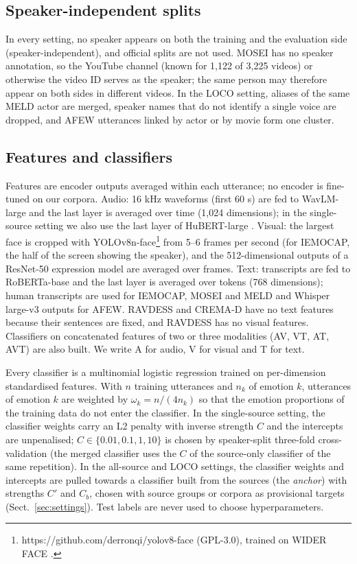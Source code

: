 \subsection{Speaker-independent splits}\label{sec:split}
In every setting, no speaker appears on both the training and the evaluation side (speaker-independent), and official splits are not used. MOSEI has no speaker annotation, so the YouTube channel (known for 1,122 of 3,225 videos) or otherwise the video ID serves as the speaker; the same person may therefore appear on both sides in different videos. In the LOCO setting, aliases of the same MELD actor are merged, speaker names that do not identify a single voice are dropped, and AFEW utterances linked by actor or by movie form one cluster.

\subsection{Features and classifiers}
Features are encoder outputs averaged within each utterance; no encoder is fine-tuned on our corpora. Audio: 16 kHz waveforms (first 60 s) are fed to WavLM-large \cite{chen2022wavlm} and the last layer is averaged over time (1,024 dimensions); in the single-source setting we also use the last layer of HuBERT-large \cite{hsu2021}. Visual: the largest face is cropped with YOLOv8n-face\footnote{https://github.com/derronqi/yolov8-face (GPL-3.0), trained on WIDER FACE \cite{yang2016}.} from 5--6 frames per second (for IEMOCAP, the half of the screen showing the speaker), and the 512-dimensional outputs of a ResNet-50 expression model \cite{ryumina2022} are averaged over frames. Text: transcripts are fed to RoBERTa-base \cite{liu2019roberta} and the last layer is averaged over tokens (768 dimensions); human transcripts are used for IEMOCAP, MOSEI and MELD and Whisper large-v3 \cite{radford2023whisper} outputs for AFEW. RAVDESS and CREMA-D have no text features because their sentences are fixed, and RAVDESS has no visual features. Classifiers on concatenated features of two or three modalities (AV, VT, AT, AVT) are also built. We write A for audio, V for visual and T for text.

Every classifier is a multinomial logistic regression trained on per-dimension standardised features. With $n$ training utterances and $n_k$ of emotion $k$, utterances of emotion $k$ are weighted by $\omega_k=n/(4n_k)$ so that the emotion proportions of the training data do not enter the classifier. In the single-source setting, the classifier weights carry an L2 penalty with inverse strength $C$ and the intercepts are unpenalised; $C\in\{0.01,0.1,1,10\}$ is chosen by speaker-split three-fold cross-validation (the merged classifier uses the $C$ of the source-only classifier of the same repetition). In the all-source and LOCO settings, the classifier weights and intercepts are pulled towards a classifier built from the sources (the \emph{anchor}) with strengths $C'$ and $C_b$, chosen with source groups or corpora as provisional targets (Sect.~\ref{sec:settings}). Test labels are never used to choose hyperparameters.

